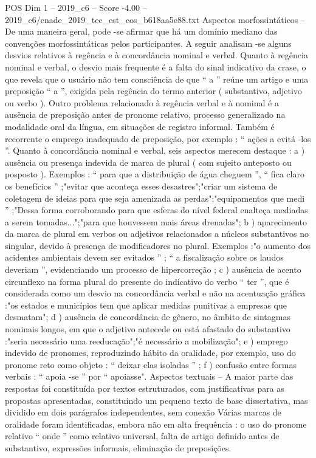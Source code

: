 \begin{textsample}{POS Dim 1 – 2019\_c6 – Score -4.00 – 2019\_c6/enade\_2019\_tec\_est\_cos\_b618aa5e88.txt}
Aspectos morfossintáticos – De uma maneira geral, pode -se afirmar que há um domínio mediano das convenções morfossintáticas pelos participantes.
A seguir analisam -se alguns desvios relativos à regência e à concordância nominal e verbal.
Quanto à regência nominal e verbal, o desvio mais frequente é a falta do sinal indicativo da crase, o que revela que o usuário não tem consciência de que “ a ” reúne um artigo e uma preposição “ a ”, exigida pela regência do termo anterior ( substantivo, adjetivo ou verbo ).
Outro problema relacionado à regência verbal e à nominal é a ausência de preposição antes de pronome relativo, processo generalizado na modalidade oral da língua, em situações de registro informal.
Também é recorrente o emprego inadequado de preposição, por exemplo : “ ações a evitá -los ”.
Quanto à concordância nominal e verbal, seis aspectos merecem destaque : a ) ausência ou presença indevida de marca de plural ( com sujeito anteposto ou posposto ).
Exemplos : “ para que a distribuição de água cheguem ”, “ fica claro os benefícios ” ;"evitar que aconteça esses desastres";"criar um sistema de coletagem de ideias para que seja amenizada as perdas";"equipamentos que medi ” ;"Dessa forma corroborando para que esferas do nível federal enalteça mediadas a serem tomadas...";"para que houvessem mais áreas drenadas"; b ) aparecimento da marca de plural em verbos ou adjetivos relacionados a núcleos substantivos no singular, devido à presença de modificadores no plural.
Exemplos :"o aumento dos acidentes ambientais devem ser evitados ” ; “ a fiscalização sobre os laudos deveriam ”, evidenciando um processo de hipercorreção ; c ) ausência de acento circunflexo na forma plural do presente do indicativo do verbo “ ter ”, que é considerada como um desvio na concordância verbal e não na acentuação gráfica :"os estados e municípios tem que aplicar medidas punitivas a empresas que desmatam"; d ) ausência de concordância de gênero, no âmbito de sintagmas nominais longos, em que o adjetivo antecede ou está afastado do substantivo :"seria necessário uma reeducação";"é necessário a mobilização"; e ) emprego indevido de pronomes, reproduzindo hábito da oralidade, por exemplo, uso do pronome reto como objeto : “ deixar elas isoladas ” ; f ) confusão entre formas verbais : “ apoia -se ” por “ apoiasse".
Aspectos textuais – A maior parte das respostas foi constituída por textos estruturados, com justificativas para as propostas apresentadas, constituindo um pequeno texto de base dissertativa, mas dividido em dois parágrafos independentes, sem conexão Várias marcas de oralidade foram identificadas, embora não em alta frequência : o uso do pronome relativo “ onde ” como relativo universal, falta de artigo definido antes de substantivo, expressões informais, eliminação de preposições.

\end{textsample}
